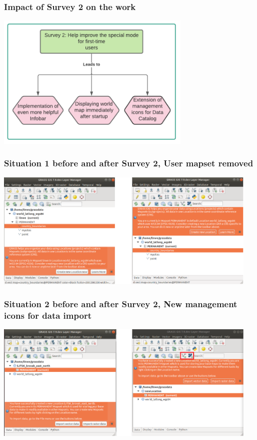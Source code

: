 \documentclass[aspectratio=169]{beamer}
\begin{document}
\begin{frame}
\frametitle{Impact of Survey 2 on the work}
	\centering
        \includegraphics[width=0.7\textwidth]{pictures/survey2.PNG}
\end{frame}

\begin{frame}
\frametitle{Situation 1 before and after Survey 2, User mapset removed}
	\centering
        \includegraphics[width=0.95\textwidth]{pictures/info1.PNG}
\end{frame}

\begin{frame}
\frametitle{Situation 2 before and after Survey 2, New management icons for data import}
	\centering
        \includegraphics[width=0.95\textwidth]{pictures/info2.PNG}
\end{frame}
\end{document}
